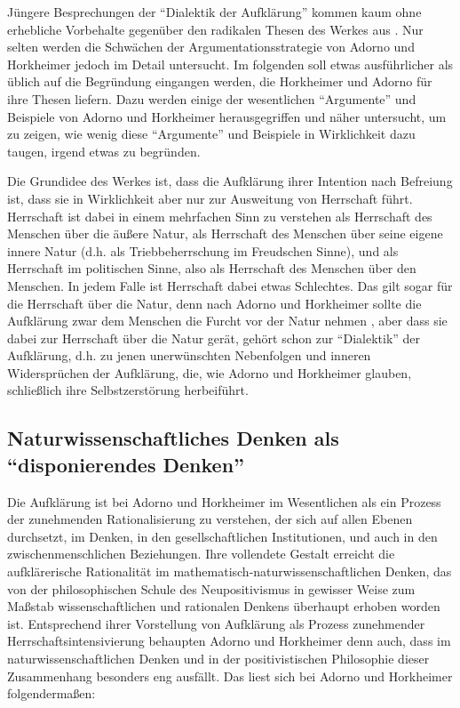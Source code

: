 \documentclass[12pt,a4paper,ngerman]{article}
\begin{document}
Jüngere Besprechungen der "`Dialektik der Aufklärung"' kommen kaum ohne
erhebliche Vorbehalte gegenüber den radikalen Thesen des Werkes aus
\cite[S. 130-157]{habermas:1985} \cite[]{schnaedelbach:1989}. Nur selten
werden die Schwächen der Argumentationsstrategie von Adorno und Horkheimer
jedoch im Detail untersucht. Im folgenden soll etwas ausführlicher als üblich
auf die Begründung eingangen werden, die Horkheimer und Adorno für ihre Thesen
liefern.  Dazu werden einige der wesentlichen "`Argumente"' und Beispiele von
Adorno und Horkheimer herausgegriffen und näher untersucht, um zu zeigen, wie
wenig diese "`Argumente"' und Beispiele in Wirklichkeit dazu taugen, irgend
etwas zu begründen.

Die Grundidee des Werkes ist, dass die Aufklärung ihrer Intention nach
Befreiung ist, dass sie in Wirklichkeit aber nur zur Ausweitung von
Herrschaft führt. Herrschaft ist dabei in einem mehrfachen Sinn zu
verstehen als Herrschaft des Menschen über die äußere Natur, als
Herrschaft des Menschen über seine eigene innere Natur (d.h. als
Triebbeherrschung im Freudschen Sinne), und als Herrschaft im
politischen Sinne, also als Herrschaft des Menschen über den Menschen.
In jedem Falle ist Herrschaft dabei etwas Schlechtes. Das gilt sogar
für die Herrschaft über die Natur, denn nach Adorno und Horkheimer
sollte die Aufklärung zwar dem Menschen die Furcht vor der Natur
nehmen \cite[S. 9]{adorno-horkheimer:1947}, aber dass sie dabei zur
Herrschaft über die Natur gerät, gehört schon zur "`Dialektik"' der
Aufklärung, d.h. zu jenen unerwünschten Nebenfolgen und inneren
Widersprüchen der Aufklärung, die, wie Adorno und Horkheimer glauben,
schließlich ihre Selbstzerstörung herbeiführt.

\subsection{Naturwissenschaftliches Denken als "`disponierendes Denken"'}

Die Aufklärung ist bei Adorno und Horkheimer im Wesentlichen als ein
Prozess der zunehmenden Rationalisierung zu verstehen, der sich auf
allen Ebenen durchsetzt, im Denken, in den gesellschaftlichen
Institutionen, und auch in den zwischenmenschlichen Beziehungen. Ihre
vollendete Gestalt erreicht die aufklärerische Rationalität im
mathe\-ma\-tisch\--\-na\-tur\-wis\-sen\-schaft\-lich\-en Denken, das
von der philosophischen Schule des Neupositivismus in gewisser Weise
zum Maßstab wissenschaftlichen und rationalen Denkens überhaupt
erhoben worden ist. Entsprechend ihrer Vorstellung von Aufklärung als
Prozess zunehmender Herrschaftsintensivierung behaupten Adorno und
Horkheimer denn auch, dass im naturwissenschaftlichen Denken und in
der positivistischen Philosophie dieser Zusammenhang besonders eng
ausfällt. Das liest sich bei Adorno und Horkheimer folgendermaßen:
\end{document}
